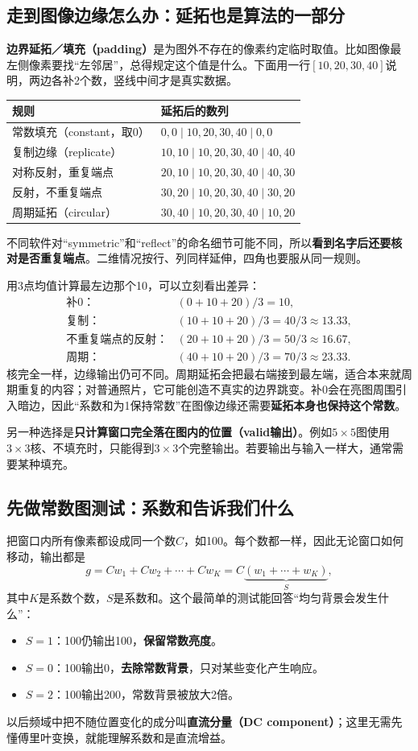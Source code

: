 \subsection{走到图像边缘怎么办：延拓也是算法的一部分}
\textbf{边界延拓／填充（padding）}是为图外不存在的像素约定临时取值。比如图像最左侧像素要找“左邻居”，总得规定这个值是什么。下面用一行$[10,20,30,40]$说明，两边各补2个数，竖线中间才是真实数据。
\begin{center}
\begin{tabular}{ll}
\toprule
规则 & 延拓后的数列\\
\midrule
常数填充（constant，取0） & $0,0\mid10,20,30,40\mid0,0$\\
复制边缘（replicate） & $10,10\mid10,20,30,40\mid40,40$\\
对称反射，重复端点 & $20,10\mid10,20,30,40\mid40,30$\\
反射，不重复端点 & $30,20\mid10,20,30,40\mid30,20$\\
周期延拓（circular） & $30,40\mid10,20,30,40\mid10,20$\\
\bottomrule
\end{tabular}
\end{center}
不同软件对“symmetric”和“reflect”的命名细节可能不同，所以\textbf{看到名字后还要核对是否重复端点}。二维情况按行、列同样延伸，四角也要服从同一规则。

用3点均值计算最左边那个10，可以立刻看出差异：
\[
 \begin{array}{ll}
 \text{补0：}&(0+10+20)/3=10,\\
 \text{复制：}&(10+10+20)/3=40/3\approx13.33,\\
 \text{不重复端点的反射：}&(20+10+20)/3=50/3\approx16.67,\\
 \text{周期：}&(40+10+20)/3=70/3\approx23.33.
 \end{array}
\]
核完全一样，边缘输出仍可不同。周期延拓会把最右端接到最左端，适合本来就周期重复的内容；对普通照片，它可能创造不真实的边界跳变。补0会在亮图周围引入暗边，因此“系数和为1保持常数”在图像边缘还需要\textbf{延拓本身也保持这个常数}。

另一种选择是\textbf{只计算窗口完全落在图内的位置（valid输出）}。例如$5\times5$图使用$3\times3$核、不填充时，只能得到$3\times3$个完整输出。若要输出与输入一样大，通常需要某种填充。

\subsection{先做常数图测试：系数和告诉我们什么}
把窗口内所有像素都设成同一个数$C$，如100。每个数都一样，因此无论窗口如何移动，输出都是
\[
 g=Cw_1+Cw_2+\cdots+Cw_K
   =C\underbrace{(w_1+\cdots+w_K)}_{S},
\]
其中$K$是系数个数，$S$是系数和。这个最简单的测试能回答“均匀背景会发生什么”：
\begin{itemize}
 \item $S=1$：100仍输出100，\textbf{保留常数亮度}。
 \item $S=0$：100输出0，\textbf{去除常数背景}，只对某些变化产生响应。
 \item $S=2$：100输出200，常数背景被放大2倍。
\end{itemize}
以后频域中把不随位置变化的成分叫\textbf{直流分量（DC component）}；这里无需先懂傅里叶变换，就能理解系数和是直流增益。

